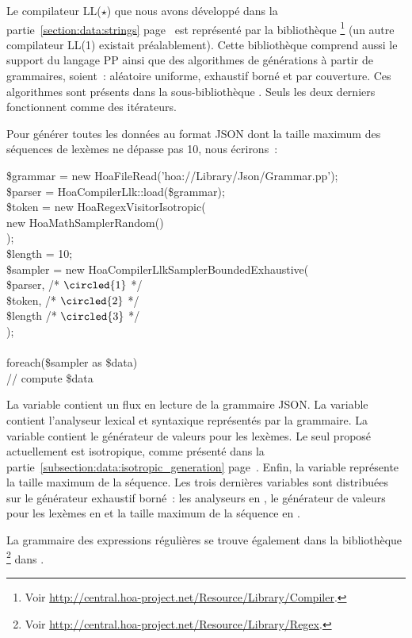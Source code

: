 Le compilateur LL($\star$) que nous avons développé dans la
partie~\ref{section:data:strings} page~\pageref{section:data:strings} est
représenté par la bibliothèque
\footnote{Voir
\url{http://central.hoa-project.net/Resource/Library/Compiler}.} (un autre
compilateur LL(1) existait préalablement). Cette bibliothèque comprend aussi le
support du langage PP ainsi que des algorithmes de générations à partir de
grammaires, soient~: aléatoire uniforme, exhaustif borné et par couverture. Ces
algorithmes sont présents dans la sous-bibliothèque
.  Seuls les deux
derniers fonctionnent comme des itérateurs.

\begin{example}

Pour générer toutes les données au format JSON dont la taille maximum des
séquences de lexèmes ne dépasse pas 10, nous écrirons~:
%
\begin{pre}
\$grammar = new Hoa\bslash{}File\bslash{}Read('hoa://Library/Json/Grammar.pp'); \\
\$parser  = Hoa\bslash{}Compiler\bslash{}Llk::load(\$grammar); \\
\$token   = new Hoa\bslash{}Regex\bslash{}Visitor\bslash{}Isotropic( \\
    new Hoa\bslash{}Math\bslash{}Sampler\bslash{}Random() \\
); \\
\$length  = 10; \\
\$sampler = new Hoa\bslash{}Compiler\bslash{}Llk\bslash{}Sampler\bslash{}BoundedExhaustive( \\
    \$parser, /* \(\circled{1}\) */ \\
    \$token,  /* \(\circled{2}\) */ \\
    \$length  /* \(\circled{3}\) */ \\
); \\
 \\
foreach(\$sampler as \$data) \\
    // compute \$data
\end{pre}
%
La variable  contient un flux en lecture de la grammaire JSON.
La variable  contient l'analyseur lexical et syntaxique
représentés par la grammaire. La variable  contient le générateur
de valeurs pour les lexèmes. Le seul proposé actuellement est isotropique, comme
présenté dans la partie~\ref{subsection:data:isotropic_generation}
page~\pageref{subsection:data:isotropic_generation}. Enfin, la variable
 représente la taille maximum de la séquence. Les trois dernières
variables sont distribuées sur le générateur exhaustif borné~: les analyseurs en
, le générateur de valeurs pour les lexèmes en  et la
taille maximum de la séquence en .

\end{example}

La grammaire des expressions régulières se trouve également dans la bibliothèque
\footnote{Voir
\url{http://central.hoa-project.net/Resource/Library/Regex}.} dans
.
